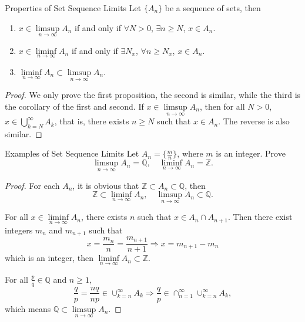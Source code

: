\begin{proposition}{Properties of Set Sequence Limits}{}
  Let $\{A_n\}$ be a sequence of sets, then
  \begin{enumerate}
  \item $x \in \limsup \limits_{n \rightarrow \infty} A_n$ if and only if
    $\forall N > 0$, $\exists n \geq N$, $x \in A_n$.
  \item $x \in \liminf \limits_{n \rightarrow \infty} A_n$ if and only if
    $\exists N_x$, $\forall n \geq N_x$, $x \in A_n$.
  \item $\liminf \limits_{n \rightarrow \infty} A_n \subset \limsup \limits_{n
      \rightarrow \infty} A_n$.
  \end{enumerate}
\end{proposition}

\begin{proof}
  We only prove the first proposition, the second is similar,
  while the third is the corollary of the first and second.
  If $x \in \limsup\limits_{n \rightarrow \infty}A_n$,
  then for all $N > 0$, $x \in \bigcup \limits_{k = N}^{\infty}A_k$,
  that is, there exists $n \geq N$ such that $x \in A_n$.
  The reverse is also similar.
\end{proof}

\begin{example}{Examples of Set Sequence Limits}{}
  Let $A_n = \{\frac{m}{n}\}$, where $m$ is an integer. Prove
  \begin{equation}
    \limsup \limits_{n \rightarrow \infty} A_n = \mathbb{Q}, \quad
    \liminf \limits_{n \rightarrow \infty} A_n = \mathbb{Z}.
  \end{equation}
\end{example}

\begin{proof}
  For each $A_n$, it is obvious that $\mathbb{Z} \subset A_n \subset
  \mathbb{Q}$, then
  \begin{equation}
    \mathbb{Z} \subset \liminf \limits_{n \rightarrow \infty} A_n, \quad
    \limsup \limits_{n \rightarrow \infty} A_n \subset \mathbb{Q}.
  \end{equation}

  For all $x \in \liminf \limits_{n \rightarrow \infty} A_n$, there exists $n$
  such that $x \in A_n \cap A_{n+1}$.
  Then there exist integers $m_n$ and $m_{n+1}$ such that
  \begin{equation}
    x = \frac{m_n}{n} = \frac{m_{n+1}}{n+1} \Rightarrow x = m_{n+1} - m_n
  \end{equation}
  which is an integer, then $\liminf \limits_{n \rightarrow \infty} A_n \subset \mathbb{Z}$.

  For all $\frac{p}{q} \in \mathbb{Q}$ and $n \geq 1$,
  \begin{equation}
    \frac{q}{p} = \frac{nq}{np} \in \cup _{k = n}^{\infty} A_k
    \Rightarrow
    \frac{q}{p} \in \cap _{n = 1}^{\infty} \cup _{k = n}^{\infty}A_k,
  \end{equation}
  which means $\mathbb{Q} \subset \limsup \limits_{n \rightarrow \infty}A_n$.
\end{proof}

